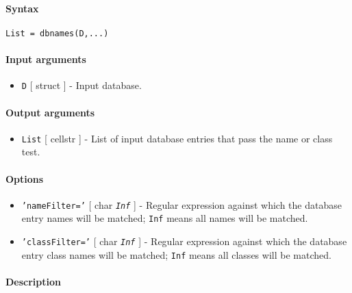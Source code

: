


	\paragraph{Syntax}\label{syntax}

\begin{verbatim}
List = dbnames(D,...)
\end{verbatim}

\paragraph{Input arguments}\label{input-arguments}

\begin{itemize}
\itemsep1pt\parskip0pt
\item
  \texttt{D} {[} struct {]} - Input database.
\end{itemize}

\paragraph{Output arguments}\label{output-arguments}

\begin{itemize}
\itemsep1pt\parskip0pt
\item
  \texttt{List} {[} cellstr {]} - List of input database entries that
  pass the name or class test.
\end{itemize}

\paragraph{Options}\label{options}

\begin{itemize}
\item
  \texttt{'nameFilter='} {[} char \textbar{} \emph{\texttt{Inf}} {]} -
  Regular expression against which the database entry names will be
  matched; \texttt{Inf} means all names will be matched.
\item
  \texttt{'classFilter='} {[} char \textbar{} \emph{\texttt{Inf}} {]} -
  Regular expression against which the database entry class names will
  be matched; \texttt{Inf} means all classes will be matched.
\end{itemize}

\paragraph{Description}\label{description}

